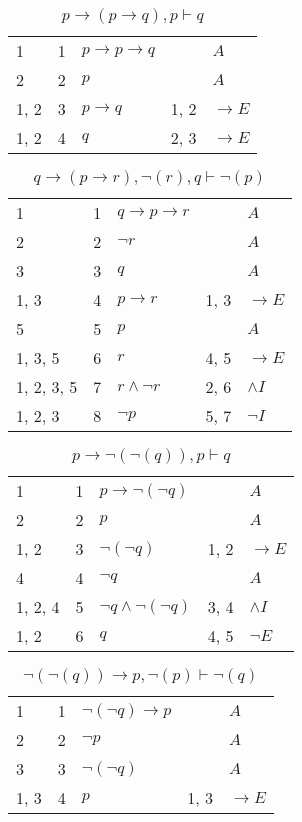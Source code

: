 \documentclass{article}
\begin{document}
\begin{table}[htbp]
\end{table}\begin{table}[htbp]\caption*{$p → (p → q),p ⊢ q$}\centering\begin{tabular}{lrlll}
{1} & 1 & $p→p→q$ & {} & $A$ \\
{2} & 2 & $p$ & {} & $A$ \\
{1, 2} & 3 & $p→q$ & {1, 2} & $→E$ \\
{1, 2} & 4 & $q$ & {2, 3} & $→E$ \\
\end{tabular}
\end{table}\begin{table}[htbp]\caption*{$q → (p → r),¬(r),q ⊢ ¬(p)$}\centering\begin{tabular}{lrlll}
{1} & 1 & $q→p→r$ & {} & $A$ \\
{2} & 2 & $¬r$ & {} & $A$ \\
{3} & 3 & $q$ & {} & $A$ \\
{1, 3} & 4 & $p→r$ & {1, 3} & $→E$ \\
{5} & 5 & $p$ & {} & $A$ \\
{1, 3, 5} & 6 & $r$ & {4, 5} & $→E$ \\
{1, 2, 3, 5} & 7 & $r∧ ¬r$ & {2, 6} & $∧I$ \\
{1, 2, 3} & 8 & $¬p$ & {5, 7} & $¬I$ \\
\end{tabular}
\end{table}\begin{table}[htbp]\caption*{$p → ¬(¬(q)),p ⊢ q$}\centering\begin{tabular}{lrlll}
{1} & 1 & $p→ ¬ (¬q)$ & {} & $A$ \\
{2} & 2 & $p$ & {} & $A$ \\
{1, 2} & 3 & $¬ (¬q)$ & {1, 2} & $→E$ \\
{4} & 4 & $¬q$ & {} & $A$ \\
{1, 2, 4} & 5 & $¬q∧ ¬ (¬q)$ & {3, 4} & $∧I$ \\
{1, 2} & 6 & $q$ & {4, 5} & $¬E$ \\
\end{tabular}
\end{table}\begin{table}[htbp]\caption*{$¬(¬(q)) → p,¬(p) ⊢ ¬(q)$}\centering\begin{tabular}{lrlll}
{1} & 1 & $¬ (¬q)→p$ & {} & $A$ \\
{2} & 2 & $¬p$ & {} & $A$ \\
{3} & 3 & $¬ (¬q)$ & {} & $A$ \\
{1, 3} & 4 & $p$ & {1, 3} & $→E$ \\

\end{tabular}
\end{table}
\end{document}
